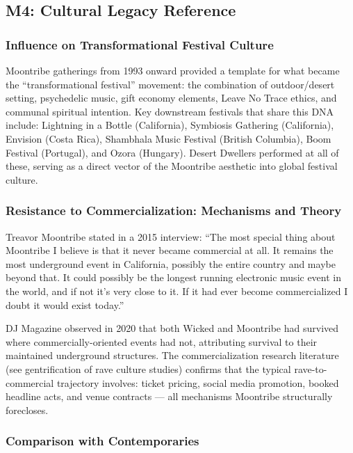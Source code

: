 \documentclass[11pt,letterpaper]{article}
\begin{document}
\subsection{M4: Cultural Legacy Reference}

\subsubsection{Influence on Transformational Festival Culture}

Moontribe gatherings from 1993 onward provided a template for what became the ``transformational festival'' movement: the combination of outdoor/desert setting, psychedelic music, gift economy elements, Leave No Trace ethics, and communal spiritual intention. Key downstream festivals that share this DNA include: Lightning in a Bottle (California), Symbiosis Gathering (California), Envision (Costa Rica), Shambhala Music Festival (British Columbia), Boom Festival (Portugal), and Ozora (Hungary). Desert Dwellers performed at all of these, serving as a direct vector of the Moontribe aesthetic into global festival culture.

\subsubsection{Resistance to Commercialization: Mechanisms and Theory}

Treavor Moontribe stated in a 2015 interview: ``The most special thing about Moontribe I believe is that it never became commercial at all. It remains the most underground event in California, possibly the entire country and maybe beyond that. It could possibly be the longest running electronic music event in the world, and if not it's very close to it. If it had ever become commercialized I doubt it would exist today.''

DJ Magazine observed in 2020 that both Wicked and Moontribe had survived where commercially-oriented events had not, attributing survival to their maintained underground structures. The commercialization research literature (see gentrification of rave culture studies) confirms that the typical rave-to-commercial trajectory involves: ticket pricing, social media promotion, booked headline acts, and venue contracts --- all mechanisms Moontribe structurally forecloses.

\subsubsection{Comparison with Contemporaries}
\end{document}
